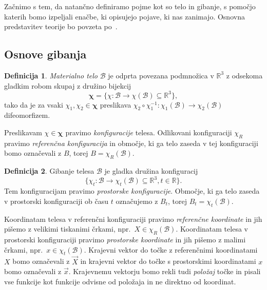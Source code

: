 \documentclass[12pt,a4paper,twoside]{article}
\theoremstyle{definition} %
\newtheorem{definicija}{Definicija}[section]
\theoremstyle{plain} %
\numberwithin{equation}{section}
\newcommand{\R}{\mathbb R}
\newcommand{\B}{\mathcal{B}}
\renewcommand{\b}{\boldsymbol}
\newcommand{\vX}{\vec{X}}
\newcommand{\vx}{\vec{x}}
\begin{document}
Začnimo s tem, da natančno definiramo pojme kot so telo in gibanje, s pomočjo katerih bomo izpeljali
enačbe, ki opisujejo pojave, ki nas zanimajo. Osnovna predstavitev teorije bo povzeta
po~\cite{slaughter2012linearized}.

\subsection{Osnove gibanja}

\begin{definicija}
  \emph{Materialno telo} $\B$ je odprta povezana podmnožica v $\R^3$ z odsekoma gladkim
  robom skupaj z družino bijekcij
  \begin{equation}
    \b\chi = \{\chi \colon\B\to\chi(\B) \subseteq \R^3\},
  \end{equation}
  tako da je za vsaki $\chi_1, \chi_2 \in \b\chi$ preslikava
  $\chi_2\circ\chi_1^{-1}\colon \chi_1(\B) \to \chi_2(\B)$
  difeomorfizem.

  Preslikavam $\chi \in \b\chi$ pravimo \emph{konfiguracije} telesa. Odlikovani
  konfiguraciji $\chi_R$ pravimo \emph{referenčna konfiguracija} in območje, ki
  ga telo zaseda v tej konfiguraciji bomo označevali z $B$, torej $B =
  \chi_R(\B)$.
\end{definicija}

\begin{definicija}
  \label{def:gibanje}
  Gibanje telesa $\B$ je gladka družina konfiguracij
  \begin{equation}
    \{\chi_t\colon \B \to\chi_t(\B) \subseteq \R^3, t \in \R\}.
  \end{equation}
  Tem konfiguracijam pravimo \emph{prostorske konfiguracije}. Območje, ki ga
  telo zaseda v prostorski konfiguraciji ob času $t$ označujemo z $B_t$, torej
  $B_t = \chi_t(\B)$.
\end{definicija}
Koordinatam telesa v referenčni konfiguraciji pravimo \emph{referenčne koordinate} in jih pišemo z
velikimi tiskanimi črkami, npr.~$X \in \chi_R(\B)$. Koordinatam telesa v prostorski konfiguraciji
pravimo \emph{prostorske koordinate} in jih pišemo z malimi črkami, npr.~$x \in \chi_t(\B)$.
Krajevni vektor do točke z referenčnimi koordinatami $X$ bomo označevali z $\vX$ in krajevni vektor
do točke s prostorskimi koordinatami $x$ bomo označevali z $\vx$. Krajevnemu vektorju bomo rekli
tudi \emph{položaj} točke in pisali vse funkcije kot funkcije odvisne od položaja in ne direktno od
koordinat.
\end{document}
